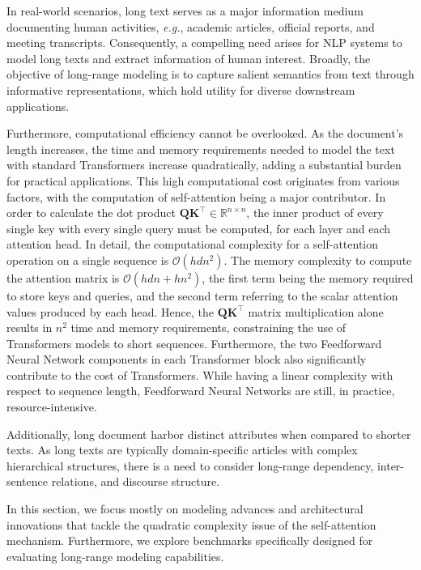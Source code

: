 
In real-world scenarios, long text serves as a major information medium documenting human activities, \textit{e.g.}, academic articles, official reports, and meeting transcripts. Consequently, a compelling need arises for \ac{NLP} systems to model long texts and extract information of human interest. Broadly, the objective of long-range modeling is to capture salient semantics from text through informative representations, which hold utility for diverse downstream applications.
 
Furthermore, computational efficiency cannot be overlooked. As the document's length increases, the time and memory requirements needed to model the text with standard Transformers increase quadratically, adding a substantial burden for practical applications. This high computational cost originates from various factors, with the computation of self-attention being a major contributor. In order to calculate the dot product $\bm{Q}\bm{K}^{\top} \in \mathbb{R}^{n \times n}$, the inner product of every single key with every single query must be computed, for each layer and each attention head.  In detail, the computational complexity for a self-attention operation on a single sequence is $\mathcal{O}(hdn^2)$. The memory complexity to compute the attention matrix is $\mathcal{O}(hdn + hn^2)$, the first term being the memory required to store keys and queries, and the second term referring to the scalar attention values produced by each head. Hence, the $\bm{Q}\bm{K}^{\top}$ matrix multiplication alone results in $n^2$ time and memory requirements, constraining the use of Transformers models to short sequences. Furthermore, the two Feedforward Neural Network components in each Transformer block also significantly contribute to the cost of Transformers. While having a linear complexity with respect to sequence length, Feedforward Neural Networks are still, in practice, resource-intensive.

Additionally, long document harbor distinct attributes when compared to shorter texts. As long texts are typically domain-specific articles with complex hierarchical structures, there is a need to consider long-range dependency, inter-sentence relations, and discourse structure.

In this section, we focus mostly on modeling advances and architectural innovations that tackle the quadratic complexity issue of the self-attention mechanism. Furthermore, we explore benchmarks specifically designed for evaluating long-range modeling capabilities.

